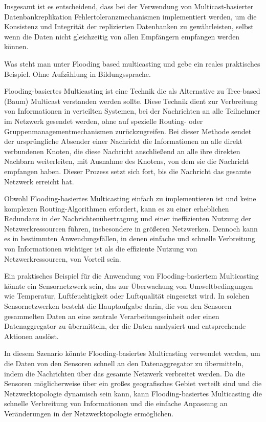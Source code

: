 Insgesamt ist es entscheidend, dass bei der Verwendung von Multicast-basierter Datenbankreplikation Fehlertoleranzmechanismen implementiert werden, um die Konsistenz und Integrität der replizierten Datenbanken zu gewährleisten, selbst wenn die Daten nicht gleichzeitig von allen Empfängern empfangen werden können.

Was steht man unter Flooding based multicasting und gebe ein reales praktisches Beispiel. Ohne Aufzählung in Bildungssprache. 

Flooding-basiertes Multicasting ist eine Technik die als Alternative zu Tree-based (Baum) Multicast verstanden werden sollte. Diese Technik dient zur Verbreitung von Informationen in verteilten Systemen, bei der Nachrichten an alle Teilnehmer im Netzwerk gesendet werden, ohne auf spezielle Routing- oder Gruppenmanagementmechanismen zurückzugreifen. Bei dieser Methode sendet der ursprüngliche Absender einer Nachricht die Informationen an alle direkt verbundenen Knoten, die diese Nachricht anschließend an alle ihre direkten Nachbarn weiterleiten, mit Ausnahme des Knotens, von dem sie die Nachricht empfangen haben. Dieser Prozess setzt sich fort, bis die Nachricht das gesamte Netzwerk erreicht hat.

Obwohl Flooding-basiertes Multicasting einfach zu implementieren ist und keine komplexen Routing-Algorithmen erfordert, kann es zu einer erheblichen Redundanz in der Nachrichtenübertragung und einer ineffizienten Nutzung der Netzwerkressourcen führen, insbesondere in größeren Netzwerken. Dennoch kann es in bestimmten Anwendungsfällen, in denen einfache und schnelle Verbreitung von Informationen wichtiger ist als die effiziente Nutzung von Netzwerkressourcen, von Vorteil sein.

Ein praktisches Beispiel für die Anwendung von Flooding-basiertem Multicasting könnte ein Sensornetzwerk sein, das zur Überwachung von Umweltbedingungen wie Temperatur, Luftfeuchtigkeit oder Luftqualität eingesetzt wird. In solchen Sensornetzwerken besteht die Hauptaufgabe darin, die von den Sensoren gesammelten Daten an eine zentrale Verarbeitungseinheit oder einen Datenaggregator zu übermitteln, der die Daten analysiert und entsprechende Aktionen auslöst.

In diesem Szenario könnte Flooding-basiertes Multicasting verwendet werden, um die Daten von den Sensoren schnell an den Datenaggregator zu übermitteln, indem die Nachrichten über das gesamte Netzwerk verbreitet werden. Da die Sensoren möglicherweise über ein großes geografisches Gebiet verteilt sind und die Netzwerktopologie dynamisch sein kann, kann Flooding-basiertes Multicasting die schnelle Verbreitung von Informationen und die einfache Anpassung an Veränderungen in der Netzwerktopologie ermöglichen.

